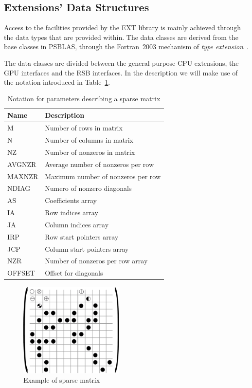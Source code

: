 \subsection{Extensions' Data Structures}
\label{sec:ext-datastruct}

Access to the facilities provided by the EXT library is mainly
achieved through the data types that are provided within. 
The data classes are derived from the base  classes in PSBLAS, through 
the Fortran~2003 mechanism of \emph{type extension}~\cite{MRC:11}.  

The data classes are divided between the general purpose CPU
extensions, the GPU interfaces and the RSB interfaces.
In the description we will make use of the notation introduced in
Table~\ref{tab:notation}. 

\begin{table}[ht]
\caption{Notation for parameters describing a sparse matrix}
\begin{center}
{\footnotesize
\begin{tabular}{ll}
\hline
Name & Description \\
\hline
M		& Number of rows in matrix		 \\
N		& Number of columns in matrix		 \\
NZ              & Number of nonzeros in matrix   \\
AVGNZR          & Average number of nonzeros per row  \\
MAXNZR          & Maximum number of nonzeros per row  \\
NDIAG           & Numero of nonzero diagonals\\
AS	        & Coefficients 	array		 \\
IA	        & Row indices array			 \\
JA	        & Column  indices array			 \\
IRP	        & Row start pointers array			 \\
JCP	        & Column start pointers array			 \\
NZR 	        & Number of nonzeros per row array \\
OFFSET          & Offset for diagonals			 \\
\hline
\end{tabular}
}
\end{center}
\label{tab:notation}
\end{table}

\begin{figure}[ht]
	\centering
		\includegraphics[width=5.2cm]{figures/mat.pdf}
	\caption{Example of sparse matrix}
	\label{fig:dense}
\end{figure} 

